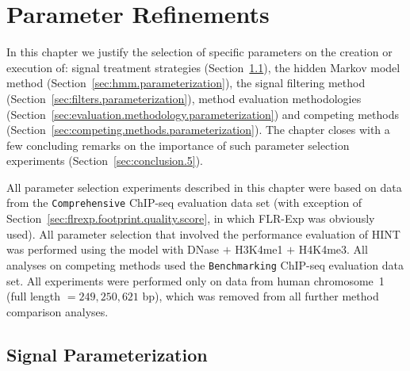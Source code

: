\chapter{Parameter Refinements}
\label{cha:parameter.refinements}

\graphicspath{{chapter5/figs/}}

In this chapter we justify the selection of specific parameters on the creation or execution of: signal treatment strategies (Section~\ref{sec:signal.parameterization}), the hidden Markov model method (Section~\ref{sec:hmm.parameterization}), the signal filtering method (Section~\ref{sec:filters.parameterization}), method evaluation methodologies (Section~\ref{sec:evaluation.methodology.parameterization}) and competing methods (Section~\ref{sec:competing.methods.parameterization}). The chapter closes with a few concluding remarks on the importance of such parameter selection experiments (Section~\ref{sec:conclusion.5}).

All parameter selection experiments described in this chapter were based on data from the {\tt Comprehensive} ChIP-seq evaluation data set (with exception of Section~\ref{sec:flrexp.footprint.quality.score}, in which FLR-Exp was obviously used). All parameter selection that involved the performance evaluation of HINT was performed using the model with DNase $+$ H3K4me1 $+$ H4K4me3. All analyses on competing methods used the {\tt Benchmarking} ChIP-seq evaluation data set. All experiments were performed only on data from human chromosome~1 (full length $= 249,250,621$ bp), which was removed from all further method comparison analyses.

\section{Signal Parameterization}
\label{sec:signal.parameterization}


